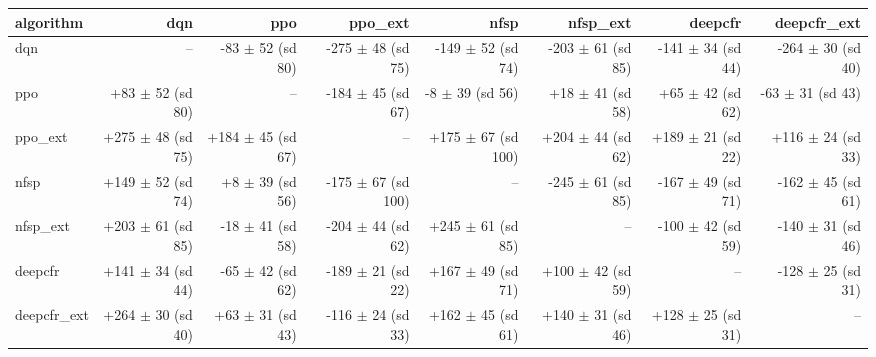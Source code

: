 \begin{tabular}{lrrrrrrr}
\toprule
algorithm & dqn & ppo & ppo\_ext & nfsp & nfsp\_ext & deepcfr & deepcfr\_ext \\
\midrule
dqn & -- & -83 $\pm$ 52 (sd 80) & -275 $\pm$ 48 (sd 75) & -149 $\pm$ 52 (sd 74) & -203 $\pm$ 61 (sd 85) & -141 $\pm$ 34 (sd 44) & -264 $\pm$ 30 (sd 40) \\
ppo & +83 $\pm$ 52 (sd 80) & -- & -184 $\pm$ 45 (sd 67) & -8 $\pm$ 39 (sd 56) & +18 $\pm$ 41 (sd 58) & +65 $\pm$ 42 (sd 62) & -63 $\pm$ 31 (sd 43) \\
ppo\_ext & +275 $\pm$ 48 (sd 75) & +184 $\pm$ 45 (sd 67) & -- & +175 $\pm$ 67 (sd 100) & +204 $\pm$ 44 (sd 62) & +189 $\pm$ 21 (sd 22) & +116 $\pm$ 24 (sd 33) \\
nfsp & +149 $\pm$ 52 (sd 74) & +8 $\pm$ 39 (sd 56) & -175 $\pm$ 67 (sd 100) & -- & -245 $\pm$ 61 (sd 85) & -167 $\pm$ 49 (sd 71) & -162 $\pm$ 45 (sd 61) \\
nfsp\_ext & +203 $\pm$ 61 (sd 85) & -18 $\pm$ 41 (sd 58) & -204 $\pm$ 44 (sd 62) & +245 $\pm$ 61 (sd 85) & -- & -100 $\pm$ 42 (sd 59) & -140 $\pm$ 31 (sd 46) \\
deepcfr & +141 $\pm$ 34 (sd 44) & -65 $\pm$ 42 (sd 62) & -189 $\pm$ 21 (sd 22) & +167 $\pm$ 49 (sd 71) & +100 $\pm$ 42 (sd 59) & -- & -128 $\pm$ 25 (sd 31) \\
deepcfr\_ext & +264 $\pm$ 30 (sd 40) & +63 $\pm$ 31 (sd 43) & -116 $\pm$ 24 (sd 33) & +162 $\pm$ 45 (sd 61) & +140 $\pm$ 31 (sd 46) & +128 $\pm$ 25 (sd 31) & -- \\
\bottomrule
\end{tabular}
